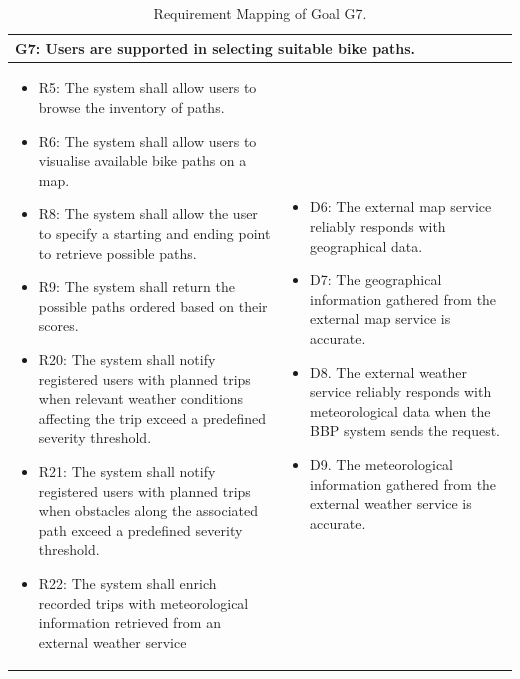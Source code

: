 \begin{table}[H]
    \renewcommand{\arraystretch}{1.3}
    \begin{tabularx}{\textwidth}{|X|X|}
    \hline
    \multicolumn{2}{|p{0.95\textwidth}|}{G7: Users are supported in selecting suitable bike paths. } \\ \hline
    \begin{itemize}[topsep=0pt, partopsep=0pt, leftmargin=*]
        \item R5: The system shall allow users to browse the inventory of paths.
        \item R6: The system shall allow users to visualise available bike paths on a map. 
        \item R8: The system shall allow the user to specify a starting and ending point to retrieve possible paths.
        \item R9: The system shall return the possible paths ordered based on their scores.
        \item R20: The system shall notify registered users with planned trips when relevant weather conditions affecting the trip exceed a predefined severity threshold.
        \item R21: The system shall notify registered users with planned trips when obstacles along the associated path exceed a predefined severity threshold.
        \item R22: The system shall enrich recorded trips with meteorological information retrieved from an external weather service
    \end{itemize} & \begin{itemize}[topsep=0pt, partopsep=0pt, leftmargin=*]
        \item D6: The external map service reliably responds with geographical data.
        \item D7: The geographical information gathered from the external map service is accurate.
        \item D8. The external weather service reliably responds with meteorological data when the BBP system sends the request.
        \item D9. The meteorological information gathered from the external weather service is accurate.
    \end{itemize} \\ \hline
    \end{tabularx}
    \caption{Requirement Mapping of Goal G7.}
    \label{tab:rm_g7}
\end{table}



